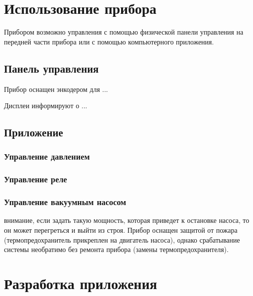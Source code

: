\documentclass[twoside, 12pt, a4paper]{refart}
\begin{document}

\newpage
\section{Использование прибора}
\label{usage}

Прибором возможно управления с помощью физической панели управления на передней части прибора или с помощью компьютерного приложения.

\subsection{Панель управления}

 Прибор оснащен энкодером для ...


 Дисплеи информируют о ...



\subsection{Приложение}


\subsubsection{Управление давлением}

\subsubsection{Управление реле}

\subsubsection{Управление вакуумным насосом}



\attention
внимание, если задать такую мощность, которая приведет к остановке насоса, то он может перегреться и выйти из строя. Прибор оснащен защитой от пожара (термопредохранитель прикреплен на двигатель насоса), однако срабатывание системы необратимо без ремонта прибора (замены термопредохранителя).



\newpage
\section{Разработка приложения}
\end{document}
